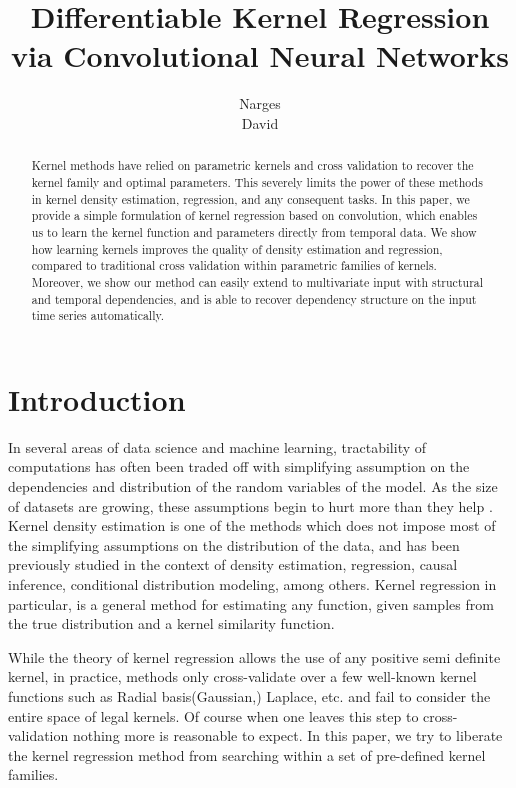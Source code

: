 \documentclass{article} %
\title{Differentiable Kernel Regression via Convolutional Neural Networks}
\author{
Narges \\
\And
David
}
\begin{document}
\maketitle

\begin{abstract}
Kernel methods have relied on parametric kernels and cross validation to recover the kernel family and optimal parameters. This severely limits the power of these methods in kernel density estimation, regression, and any consequent tasks. In this paper, we provide a simple formulation of kernel regression based on convolution, which enables us to learn the kernel function and parameters directly from temporal data. We show how learning kernels improves the quality of density estimation and regression, compared to traditional cross validation within parametric families of kernels. Moreover, we show our method can easily extend to multivariate input with structural and temporal dependencies, and is able to recover dependency structure on the input time series automatically.
\end{abstract}

\section{Introduction}

In several areas of data science and machine learning, tractability of computations has often been traded off with simplifying assumption on the dependencies and distribution of the random variables of the model.\cite{} \cite{} \cite{} \cite{} As the size of datasets are growing, these assumptions begin to hurt more than they help \cite{} \cite{} \cite{}. Kernel density estimation\cite{} is one of the methods which does not impose most of the simplifying assumptions on the distribution of the data\cite{}, and has been previously studied in the context of density estimation, regression, causal inference, conditional distribution modeling, among others. Kernel regression\cite{} in particular, is a general method for estimating any function, given samples from the true distribution and a kernel similarity function. 

While the theory of kernel regression allows the use of any positive semi definite kernel, in practice, methods only cross-validate over a few well-known kernel functions such as Radial basis(Gaussian,) Laplace, etc. and fail to consider the entire space of legal kernels. Of course when one leaves this step to cross-validation nothing more is reasonable to expect. In this paper, we try to liberate the kernel regression method from searching within a set of pre-defined kernel families.
\end{document}

